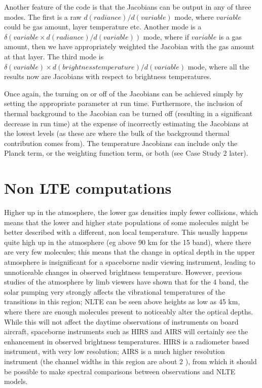 \documentclass[11pt]{article}
\begin{document}
Another feature of the code is that the Jacobians can be output in any
of three modes. The first is a raw $d(radiance)/d(variable)$ mode,
where $variable$ could be gas amount, layer temperature etc. Another
mode is a $\delta(variable \times d(radiance)/d(variable))$ mode, where if
$variable$ is a gas amount, then we have appropriately weighted the
Jacobian with the gas amount at that layer. The third mode is 
$\delta(variable) \times d(brightness temperature)/d(variable)$ mode, where
all the results now are Jacobians with respect to brightness
temperatures.

Once again, the turning on or off of the Jacobians can be achieved
simply by setting the appropriate parameter at run time. Furthermore,
the inclusion of thermal background to the Jacobian can be turned off
(resulting in a significant decrease in run time) at the expense of
incorrectly estimating the Jacobians at the lowest levels (as these
are where the bulk of the background thermal contribution comes from).
The temperature Jacobians can include only the Planck term, or the weighting
function term, or both (see Case Study 2 later). 

\section{Non LTE computations}
Higher up in the atmosphere, the lower gas densities imply fewer collisions, 
which means that the lower and higher state populations of some molecules 
might be better described with a different, non local temperature. This 
usually happens quite high up in the atmosphere (eg above 90 km for the 15 \um
\cd band), where there are very few molecules; this means that the change in 
optical depth in the upper atmosphere is insignificant for a spaceborne 
nadir viewing instrument, leading to unnoticeable changes in observed 
brightness temperature. However, previous studies of the atmosphere by limb 
viewers have shown that for the 4 \um \cd band, the solar pumping very strongly
affects the vibrational temperatures of the transitions in this region; NLTE
can be seen above heights as low as 45 km, where there are enough molecules
present to noticeably alter the optical depths. While this will not affect the 
daytime observations of instruments on board aircraft, spaceborne instruments
such as HIRS and AIRS will certainly see the enhancement in observed brightness
temperatures. HIRS is a radiometer based instrument, with very low resolution;
AIRS is a much higher resolution instrument (the channel widths in this region
are about 2 \wn), from which it should be possible to make spectral 
comparisons between observations and NLTE models.
\end{document}
